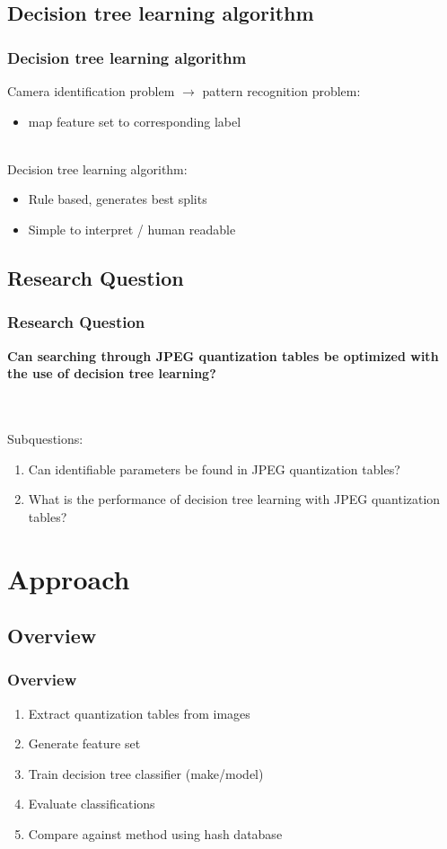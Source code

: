 \documentclass[10pt]{beamer}
\begin{document}
\subsection{Decision tree learning algorithm}
\begin{frame}
\frametitle{Decision tree learning algorithm}
Camera identification problem $\rightarrow$ pattern recognition problem:\\
\begin{itemize}
\item map feature set to corresponding label
\end{itemize}
~\\
Decision tree learning algorithm:
\begin{itemize}
\item Rule based, generates best splits
\item Simple to interpret / human readable
\end{itemize}
\end{frame}

\subsection{Research Question}
\begin{frame}
\frametitle{Research Question}
\begin{center}
\textbf{\Large Can searching through JPEG quantization tables be optimized with the use of decision tree learning?} \\ ~\\
\end{center}
~\\
Subquestions:
\begin{enumerate}
\item Can identifiable parameters be found in JPEG quantization tables?
\item What is the performance of decision tree learning with JPEG quantization tables?
\end{enumerate}
\end{frame}




\section[Approach]{Approach}
\subsection{Overview}
\begin{frame}
\frametitle{Overview}
\begin{enumerate}
\item Extract quantization tables from images
\item Generate feature set
\item Train decision tree classifier (make/model) 
\item Evaluate classifications
\item Compare against method using hash database
\end{enumerate}
\end{frame}
\end{document}
